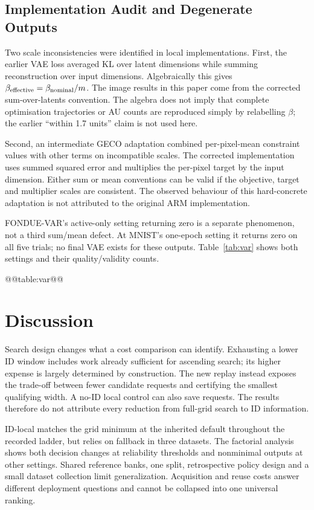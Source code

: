\subsection{Implementation Audit and Degenerate Outputs}
Two scale inconsistencies were identified in local implementations.
First, the earlier VAE loss averaged KL over latent dimensions while
summing reconstruction over input dimensions. Algebraically this gives
$\beta_{\rm effective}=\beta_{\rm nominal}/m$. The image results in
this paper come from the corrected sum-over-latents convention. The
algebra does not imply that complete optimisation trajectories or AU
counts are reproduced simply by relabelling $\beta$; the earlier
``within 1.7 units'' claim is not used here.

Second, an intermediate GECO adaptation combined per-pixel-mean
constraint values with other terms on incompatible scales. The corrected
implementation uses summed squared error and multiplies the per-pixel
target by the input dimension. Either sum or mean conventions can be
valid if the objective, target and multiplier scales are consistent.
The observed behaviour of this hard-concrete adaptation is not attributed
to the original ARM implementation.

FONDUE-VAR's active-only setting returning zero is a separate phenomenon,
not a third sum/mean defect. At MNIST's one-epoch setting it returns zero
on all five trials; no final VAE exists for these outputs.
Table~\ref{tab:var} shows both settings and their quality/validity counts.

@@table:var@@

\section{Discussion}\label{sec:discussion}
Search design changes what a cost comparison can identify. Exhausting
a lower ID window includes work already sufficient for ascending search;
its higher expense is largely determined by construction. The new replay
instead exposes the trade-off between fewer candidate requests and
certifying the smallest qualifying width. A no-ID local control can also
save requests. The results therefore do not attribute every reduction
from full-grid search to ID information.

ID-local matches the grid minimum at the inherited default throughout the
recorded ladder, but relies on fallback in three datasets. The factorial
analysis shows both decision changes at reliability thresholds and
nonminimal outputs at other settings. Shared reference banks, one split,
retrospective policy design and a small dataset collection limit
generalization. Acquisition and reuse costs answer different deployment
questions and cannot be collapsed into one universal ranking.

